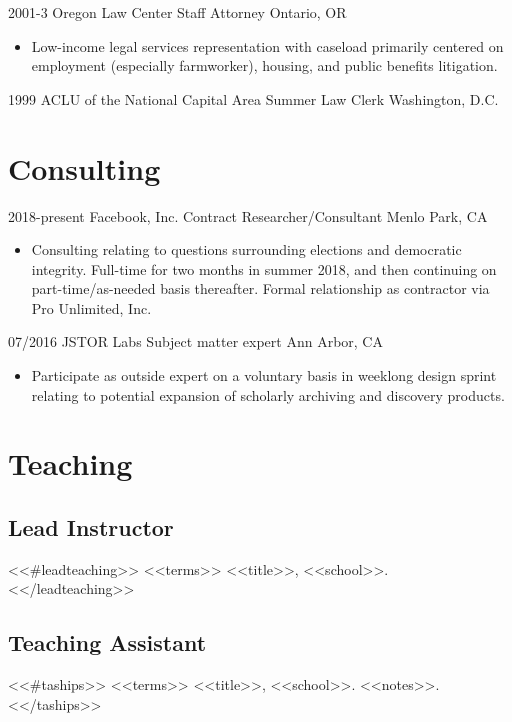 \documentclass[letterpaper]{moderncv}
\begin{document}
\cventry
{2001-3}
{Oregon Law Center}
{Staff Attorney}
{Ontario, OR}
{}
{\begin{itemize}%
	\item Low-income legal services representation with caseload primarily centered on employment
    (especially farmworker), housing, and public benefits litigation.
	\end{itemize}}

\cventry
{1999}
{ACLU of the National Capital Area}
{Summer Law Clerk}
{Washington, D.C.}
{}
{}


\section{Consulting}

\cventry
{2018-present}
{Facebook, Inc.}
{Contract Researcher/Consultant}
{Menlo Park, CA}
{}
{\begin{itemize}%
	\item Consulting relating to questions surrounding elections and democratic
    integrity. Full-time for two months in summer 2018, and then continuing on
    part-time/as-needed basis thereafter. Formal relationship
    as contractor via Pro Unlimited, Inc.
	\end{itemize}}

\cventry
{07/2016}
{JSTOR Labs}
{Subject matter expert}
{Ann Arbor, CA}
{}
{\begin{itemize}%
	\item Participate as outside expert on a voluntary basis in weeklong design
    sprint relating to potential expansion of scholarly archiving and discovery products.
	\end{itemize}}

\section{Teaching}
\subsection{Lead Instructor}
<<#leadteaching>>
\cvitem
{<<terms>>}
{<<title>>, <<school>>.}
\vspace{1mm}
<</leadteaching>>
\subsection{Teaching Assistant}
<<#taships>>
\cvitem
{<<terms>>}
{<<title>>, <<school>>.
  \newline
  <<notes>>.
}
\vspace{1mm}
<</taships>>
\end{document}
